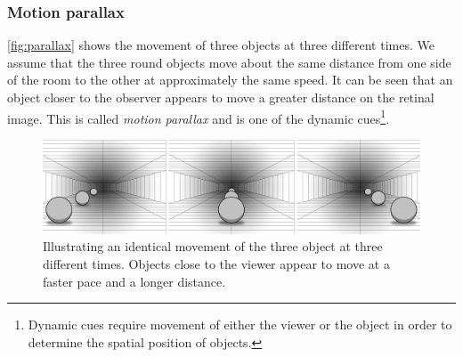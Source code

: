 \subsubsection{Motion parallax}\label{sec:parallax}
\autoref{fig:parallax} shows the movement of three objects at three different times. We assume that the three round objects move about the same distance from one side of the room to the other at approximately the same speed. It can be seen that an object closer to the observer appears to move a greater distance on the retinal image. This is called \textit{motion parallax} and is one of the dynamic cues\footnote{Dynamic cues require movement of either the viewer or the object in order to determine the spatial position of objects\citep{sensationPerception}.}\citep[p.~204]{sensationPerception}.
\begin{figure}[H]
	\centering
	\includegraphics[width=1\linewidth]{figure/Analysis/parallax.png}
	\caption{Illustrating an identical movement of the three object at three different times. Objects close to the viewer appear to move at a faster pace and a longer distance.}
	\label{fig:parallax}
\end{figure}

